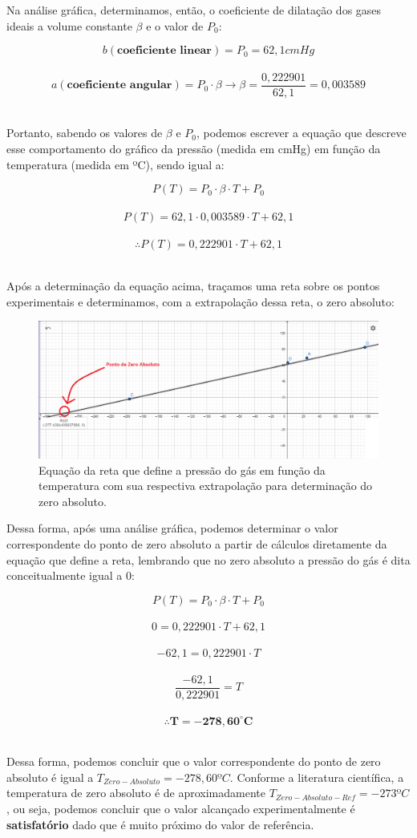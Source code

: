 Na análise gráfica, determinamos, então, o coeficiente de dilatação dos gases ideais a volume constante $\beta$ e o valor de $P_0$:

\[ b (\textbf{coeficiente linear}) = P_0 = 62,1 cmHg\]\
\[ a (\textbf{coeficiente angular}) = P_0 \cdot \beta \longrightarrow \beta = \frac{0,222901}{62,1} = 0,003589\]\

Portanto, sabendo os valores de $\beta$ e $P_0$, podemos escrever a equação que descreve esse comportamento do gráfico da pressão (medida em cmHg) em função da temperatura (medida em ºC), sendo igual a:

\[ P(T) = P_0 \cdot \beta \cdot T + P_0 \]\
\[ P(T) = 62,1 \cdot 0,003589 \cdot T + 62,1 \]\
\[ \therefore P(T) = 0,222901 \cdot T + 62,1 \]\

Após a determinação da equação acima, traçamos uma reta sobre os pontos experimentais e determinamos, com a extrapolação dessa reta, o zero absoluto:

\begin{figure}[H]
  \centering
  \includegraphics[scale=0.45]{images/Gráfico 3 - experimento 3.png}
  \caption{Equação da reta que define a pressão do gás em função da temperatura com sua respectiva extrapolação para determinação do zero absoluto.}
\end{figure}

Dessa forma, após uma análise gráfica, podemos determinar o valor correspondente do ponto de zero absoluto a partir de cálculos diretamente da equação que define a reta, lembrando que no zero absoluto a pressão do gás é dita conceitualmente igual a 0: 

\[ P(T) = P_0 \cdot \beta \cdot T + P_0 \]\
\[ 0 = 0,222901 \cdot T + 62,1 \]\
\[ -62,1 = 0,222901 \cdot T  \]\
\[ \frac{-62,1}{0,222901}  =  T  \]\
\[ \therefore \mathbf{T = -278,60 ^\circ C} \]\

Dessa forma, podemos concluir que o valor correspondente do ponto de zero absoluto é igual a $T_{Zero-Absoluto}= -278,60 ºC$. Conforme a literatura científica, a temperatura de zero absoluto é de aproximadamente $T_{Zero-Absoluto-Ref}= -273 ºC$, ou seja, podemos concluir que o valor alcançado experimentalmente é \textbf{satisfatório} dado que é muito próximo do valor de referência.
